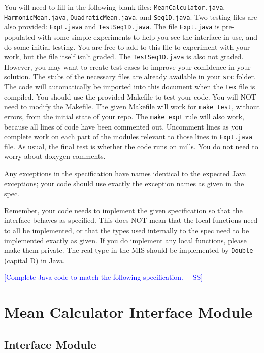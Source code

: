 \documentclass[12pt,fleqn]{examtst}
\newcommand{\authornote}[3]{\textcolor{#1}{[#3 ---#2]}}
\newcommand{\authornote}[3]{}
\newcommand{\wss}[1]{\authornote{blue}{SS}{#1}}
\begin{document}
You will need to fill in the following blank files:
\texttt{MeanCalculator.java}, \texttt{HarmonicMean.java},
\texttt{QuadraticMean.java}, and \texttt{Seq1D.java}.  Two testing files are
also provided: \texttt{Expt.java} and \texttt{TestSeq1D.java}.  The file
\texttt{Expt.java} is pre-populated with some simple experiments to help you see
the interface in use, and do some initial testing.  You are free to add to this
file to experiment with your work, but the file itself isn't graded.  The
\texttt{TestSeq1D.java} is also not graded.  However, you may want to create
test cases to improve your confidence in your solution.  The stubs of the
necessary files are already available in your \texttt{src} folder.  The code
will automatically be imported into this document when the \texttt{tex} file is
compiled.  You should use the provided Makefile to test your code.  You will NOT
need to modify the Makefile.  The given Makefile will work for \texttt{make
  test}, without errors, from the initial state of your repo.  The \texttt{make
  expt} rule will also work, because all lines of code have been commented out.
Uncomment lines as you complete work on each part of the modules relevant to
those lines in \texttt{Expt.java} file.  As usual, the final test is whether the
code runs on mills.  You do not need to worry about doxygen comments.

Any exceptions in the specification have names identical to the expected Java
exceptions; your code should use exactly the exception names as given in the
spec.

Remember, your code needs to implement the given specification so that the
interface behaves as specified.  This does NOT mean that the local functions
need to all be implemented, or that the types used internally to the spec need
to be implemented exactly as given.  If you do implement any local functions,
please make them private.  The real type in the MIS should be implemented by
\texttt{Double} (capital D) in Java.

\wss{Complete Java code to match the following specification.}


\newpage

\section* {Mean Calculator Interface Module}

\subsection*{Interface Module}
\end{document}
